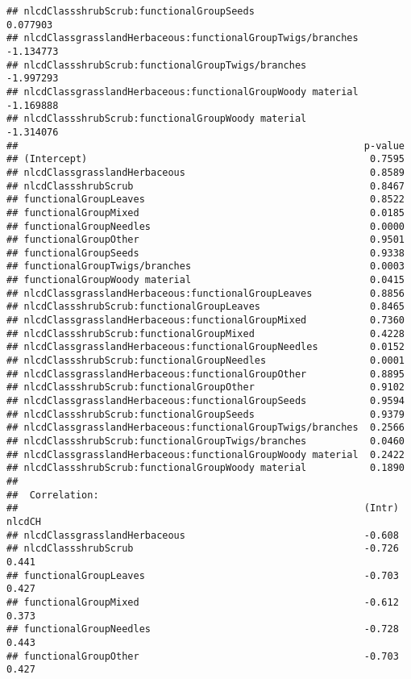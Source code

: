 \documentclass[]{article}
\begin{document}
\begin{verbatim}
## nlcdClassshrubScrub:functionalGroupSeeds                    0.077903
## nlcdClassgrasslandHerbaceous:functionalGroupTwigs/branches -1.134773
## nlcdClassshrubScrub:functionalGroupTwigs/branches          -1.997293
## nlcdClassgrasslandHerbaceous:functionalGroupWoody material -1.169888
## nlcdClassshrubScrub:functionalGroupWoody material          -1.314076
##                                                            p-value
## (Intercept)                                                 0.7595
## nlcdClassgrasslandHerbaceous                                0.8589
## nlcdClassshrubScrub                                         0.8467
## functionalGroupLeaves                                       0.8522
## functionalGroupMixed                                        0.0185
## functionalGroupNeedles                                      0.0000
## functionalGroupOther                                        0.9501
## functionalGroupSeeds                                        0.9338
## functionalGroupTwigs/branches                               0.0003
## functionalGroupWoody material                               0.0415
## nlcdClassgrasslandHerbaceous:functionalGroupLeaves          0.8856
## nlcdClassshrubScrub:functionalGroupLeaves                   0.8465
## nlcdClassgrasslandHerbaceous:functionalGroupMixed           0.7360
## nlcdClassshrubScrub:functionalGroupMixed                    0.4228
## nlcdClassgrasslandHerbaceous:functionalGroupNeedles         0.0152
## nlcdClassshrubScrub:functionalGroupNeedles                  0.0001
## nlcdClassgrasslandHerbaceous:functionalGroupOther           0.8895
## nlcdClassshrubScrub:functionalGroupOther                    0.9102
## nlcdClassgrasslandHerbaceous:functionalGroupSeeds           0.9594
## nlcdClassshrubScrub:functionalGroupSeeds                    0.9379
## nlcdClassgrasslandHerbaceous:functionalGroupTwigs/branches  0.2566
## nlcdClassshrubScrub:functionalGroupTwigs/branches           0.0460
## nlcdClassgrasslandHerbaceous:functionalGroupWoody material  0.2422
## nlcdClassshrubScrub:functionalGroupWoody material           0.1890
## 
##  Correlation: 
##                                                            (Intr) nlcdCH
## nlcdClassgrasslandHerbaceous                               -0.608       
## nlcdClassshrubScrub                                        -0.726  0.441
## functionalGroupLeaves                                      -0.703  0.427
## functionalGroupMixed                                       -0.612  0.373
## functionalGroupNeedles                                     -0.728  0.443
## functionalGroupOther                                       -0.703  0.427

\end{verbatim}
\end{document}

